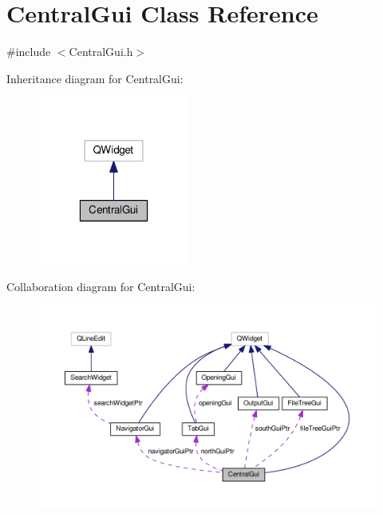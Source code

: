 \hypertarget{class_central_gui}{\section{Central\-Gui Class Reference}
\label{class_central_gui}
}


{\ttfamily \#include $<$Central\-Gui.\-h$>$}



Inheritance diagram for Central\-Gui\-:\nopagebreak
\begin{figure}[H]
\begin{center}
\leavevmode
\includegraphics[width=142pt]{class_central_gui__inherit__graph}
\end{center}
\end{figure}


Collaboration diagram for Central\-Gui\-:
\nopagebreak
\begin{figure}[H]
\begin{center}
\leavevmode
\includegraphics[width=350pt]{class_central_gui__coll__graph}
\end{center}
\end{figure}
